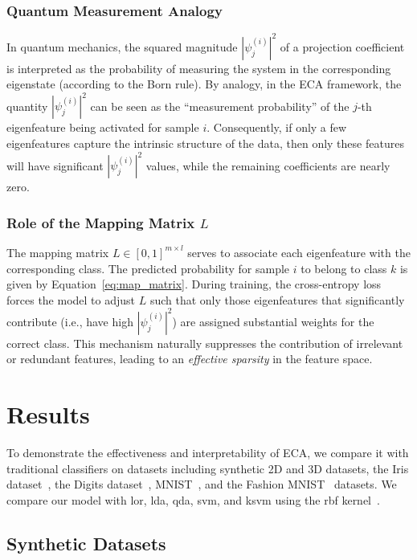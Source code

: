 \documentclass[lettersize,journal]{IEEEtran}
\begin{document}
\subsubsection{Quantum Measurement Analogy}

In quantum mechanics, the squared magnitude \( |\psi_j^{(i)}|^2 \) of a projection coefficient is interpreted as the probability of measuring the system in the corresponding eigenstate (according to the Born rule). By analogy, in the ECA framework, the quantity \( |\psi_j^{(i)}|^2 \) can be seen as the ``measurement probability'' of the \(j\)-th eigenfeature being activated for sample \(i\). Consequently, if only a few eigenfeatures capture the intrinsic structure of the data, then only these features will have significant \( |\psi_j^{(i)}|^2 \) values, while the remaining coefficients are nearly zero.

\subsubsection{Role of the Mapping Matrix \(L\)}

The mapping matrix 
$
L \in [0,1]^{m \times l}
$
serves to associate each eigenfeature with the corresponding class. The predicted probability for sample \(i\) to belong to class \(k\) is given by Equation~\ref{eq:map_matrix}.
During training, the cross-entropy loss forces the model to adjust \(L\) such that only those eigenfeatures that significantly contribute (i.e., have high \( |\psi_j^{(i)}|^2 \)) are assigned substantial weights for the correct class. This mechanism naturally suppresses the contribution of irrelevant or redundant features, leading to an \emph{effective sparsity} in the feature space.


\section{Results}

To demonstrate the effectiveness and interpretability of ECA, we compare it with traditional classifiers on datasets including synthetic 2D and 3D datasets, the Iris dataset~\cite{fisher1936use}, the Digits dataset~\cite{alpaydin1998optical}, MNIST~\cite{lecun1998gradient}, and the Fashion MNIST~\cite{xiao2017fashion} datasets. We compare our model with \Gls{lor}, \Gls{lda}, \Gls{qda}, \Gls{svm}, and \Gls{ksvm} using the \Gls{rbf} kernel~\cite{hastie2009elements,cortes1995support,burges1998tutorial}.

\subsection{Synthetic Datasets}
\end{document}
